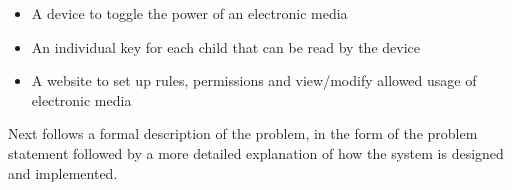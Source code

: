 \begin{itemize}
	\item A device to toggle the power of an electronic media
	\item An individual key for each child that can be read by the device
	\item A website to set up rules, permissions and view/modify allowed usage of electronic media
\end{itemize} 

Next follows a formal description of the problem, in the form of the problem statement followed by a more detailed explanation of how the system is designed and implemented.
